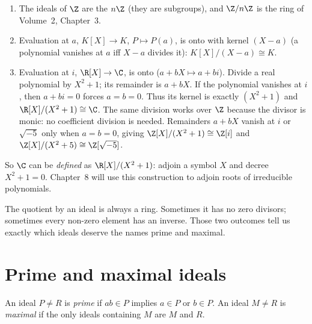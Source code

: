 \begin{example}\label{ex:quotients}
\begin{enumerate}[label=(\arabic*)]
\item The ideals of $\Z$ are the $n\Z$ (they are subgroups), and $\Z/n\Z$ is the ring of Volume~2, Chapter~3.
\item Evaluation at $a$, $K[X]\to K$, $P\mapsto P(a)$, is onto with kernel $(X-a)$ (a polynomial vanishes at $a$ iff $X-a$ divides it): $K[X]/(X-a)\cong K$.
\item Evaluation at $i$, $\R[X]\to\C$, is onto ($a+bX\mapsto a+bi$). Divide a real polynomial by $X^2+1$; its remainder is $a+bX$. If the polynomial vanishes at $i$, then $a+bi=0$ forces $a=b=0$. Thus its kernel is exactly $(X^2+1)$ and $\R[X]/(X^2+1)\cong\C$. The same division works over $\Z$ because the divisor is monic: no coefficient division is needed. Remainders $a+bX$ vanish at $i$ or $\sqrt{-5}$ only when $a=b=0$, giving $\Z[X]/(X^2+1)\cong\Z[i]$ and $\Z[X]/(X^2+5)\cong\Z[\sqrt{-5}]$.
\end{enumerate}
\end{example}

So $\C$ can be \emph{defined} as $\R[X]/(X^2+1)$: adjoin a symbol $X$ and decree $X^2+1=0$. Chapter~8 will use this construction to adjoin roots of irreducible polynomials.

The quotient by an ideal is always a ring. Sometimes it has no zero divisors; sometimes every non-zero element has an inverse. Those two outcomes tell us exactly which ideals deserve the names prime and maximal.

\section{Prime and maximal ideals}

\begin{definition}
An ideal $P\ne R$ is \emph{prime} if $ab\in P$ implies $a\in P$ or $b\in P$. An ideal $M\ne R$ is \emph{maximal} if the only ideals containing $M$ are $M$ and $R$.
\end{definition}

